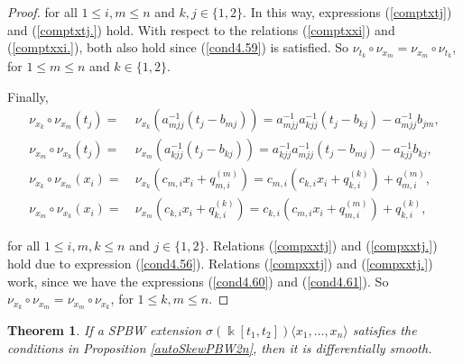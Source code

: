 \documentclass{amsart}
\newtheorem{theorem}{Theorem}[section]
\theoremstyle{definition}
\theoremstyle{remark}
\numberwithin{equation}{section}
\begin{document}
\begin{proof}
for all $1\leq i,m \leq n$ and $k,j \in \{1, 2\}$. In this way, expressions {\rm (}\ref{comptxtj}{\rm )} and {\rm (}\ref{comptxtj.}{\rm )} hold. With respect to the relations {\rm (}\ref{comptxxi}{\rm )} and {\rm (}\ref{comptxxi.}{\rm )}, both also hold since {\rm (}\ref{cond4.59}{\rm )} is satisfied. So $\nu_{t_k} \circ \nu_{x_m} = \nu_{x_m} \circ \nu_{t_k}$, for  $1\leq m \leq n$ and $k \in \{1, 2\}$.

Finally, 
\begin{align}
    \nu_{x_k} \circ \nu_{x_m}(t_j) = &\ \nu_{x_k}(a_{mjj}^{-1}(t_j-b_{mj}))=a_{mjj}^{-1}a_{kjj}^{-1}(t_j-b_{kj})-a_{mjj}^{-1}b_{jm}, \label{compxxtj}\\
    \nu_{x_m} \circ \nu_{x_k}(t_j) = &\ \nu_{x_m}(a_{kjj}^{-1}(t_j-b_{kj}))=a_{kjj}^{-1}a_{mjj}^{-1}(t_j-b_{mj})-a_{kjj}^{-1}b_{kj}, \label{compxxtj.} \\
    \nu_{x_k} \circ \nu_{x_m}(x_i) = &\ \nu_{x_k}(c_{m,i}x_i+q_{m,i}^{(m)})=c_{m,i}(c_{k,i}x_i+q_{k,i}^{(k)})+q_{m,i}^{(m)}, \label{compxxxi}\\
    \nu_{x_m} \circ \nu_{x_k}(x_i) = &\ \nu_{x_m}(c_{k,i}x_i+q_{k,i}^{(k)})=c_{k,i}(c_{m,i}x_i+q_{m,i}^{(m)})+q_{k,i}^{(k)}, \label{compxxxi.}
\end{align}

for all $1\leq i,m,k  \leq n$ and $j \in \{1, 2\}$. Relations {\rm (}\ref{compxxtj}{\rm )} and {\rm (}\ref{compxxtj.}{\rm )} hold due to expression {\rm (}\ref{cond4.56}{\rm )}. Relations {\rm (}\ref{compxxtj}{\rm )} and {\rm (}\ref{compxxtj.}{\rm )} work, since we have the expressions {\rm (}\ref{cond4.60}{\rm )} and {\rm (}\ref{cond4.61}{\rm )}. So $\nu_{x_k} \circ \nu_{x_m} = \nu_{x_m} \circ \nu_{x_k}$, for  $1\leq k, m \leq n$.
\end{proof}
\begin{theorem}\label{smoothPBW2n}
If a SPBW extension $\sigma(\Bbbk[t_1, t_2])\langle x_1, \ldots, x_n\rangle$ satisfies the conditions in Proposition \ref{autoSkewPBW2n}, then it is differentially smooth.
\end{theorem}
\end{document}
